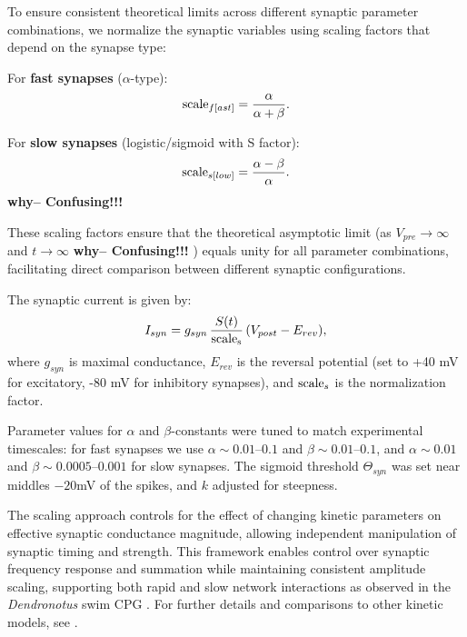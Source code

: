 \documentclass[nofootinbib,aip,amsmath,amssymb,reprint,twocolumn,10pt]{revtex4-2}
\begin{document}
To ensure consistent theoretical limits across different synaptic parameter combinations, we normalize the synaptic variables using scaling factors that depend on the synapse type:

For \textbf{fast synapses} ($\alpha$-type):
\begin{equation}
  {\rm scale}_{f[ast]} = \frac{\alpha}{\alpha + \beta}.
\end{equation}

For \textbf{slow synapses} (logistic/sigmoid with S factor):
\begin{equation}
  {\rm scale}_{s[low]} = \frac{\alpha - \beta}{\alpha}.
\end{equation}
{\bf why--  Confusing!!! }

These scaling factors ensure that the theoretical asymptotic limit (as $V_{pre} \to \infty$ and $t \to \infty$ {\bf why--  Confusing!!! }) equals unity for all parameter combinations, facilitating direct comparison between different synaptic configurations.

The synaptic current is given by:
\begin{equation}
  I_{syn} = g_{syn}\, \frac{S(t)}{\rm scale_s}\, (V_{post}-E_{rev}),
\end{equation}
where $g_{syn}$ is maximal conductance, $E_{rev}$ is the reversal potential (set to +40 mV for excitatory, -80 mV for inhibitory synapses), and ${\rm scale}_s$ is the normalization factor.

Parameter values for $\alpha$ and $\beta$-constants were tuned to match experimental timescales: for fast synapses we use $\alpha \sim 0.01$--$0.1$ and $\beta \sim 0.01$--$0.1$, and $\alpha \sim 0.01$ and $\beta \sim 0.0005$--$0.001$ for  slow synapses. The sigmoid threshold $\Theta_{syn}$ was set near middles $-20$mV of the spikes, and $k$ adjusted for steepness.

The scaling approach controls for the effect of changing kinetic parameters on effective synaptic conductance magnitude, allowing independent manipulation of synaptic timing and strength. This framework enables control over synaptic frequency response and summation while maintaining consistent amplitude scaling, supporting both rapid and slow network interactions as observed in the \textit{Dendronotus} swim CPG \cite{SakuraiKatz2016, scully2024pairing}. For further details and comparisons to other kinetic models, see \cite{destexhe1998kinetic, Hill2001}.
\end{document}

